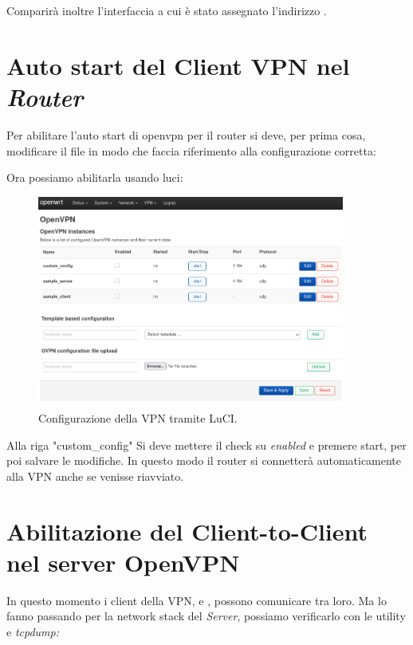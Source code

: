 Comparirà inoltre l'interfaccia  a cui è stato assegnato l'indirizzo .

\section{Auto start del Client VPN nel \textit{Router}}

Per abilitare l'auto start di openvpn per il router si deve, per prima cosa, modificare il file  in modo che faccia riferimento alla configurazione corretta:


Ora possiamo abilitarla usando luci:

\begin{figure}[H]
    \centering
    \includegraphics[width=0.9\textwidth]{immagini/LuCI_vpn1}
    \caption{Configurazione della VPN tramite LuCI.}
    \label{fig:luci-vpn}
\end{figure}

Alla riga "custom\_config" Si deve mettere il check su \textit{enabled} e premere start, per poi salvare le modifiche. In questo modo il router si connetterà automaticamente alla VPN anche se venisse riavviato.


\section{Abilitazione del Client-to-Client nel server OpenVPN}

In questo momento i client della VPN,  e , possono comunicare tra loro. Ma lo fanno passando per la network stack del \textit{Server}, possiamo verificarlo con le utility  e \it{tcpdump}:

